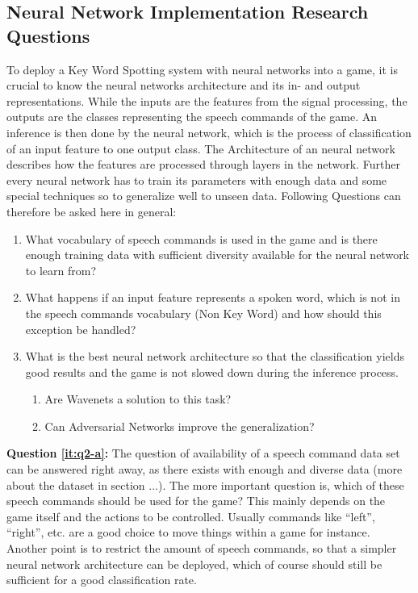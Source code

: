 \subsection{Neural Network Implementation Research Questions}
To deploy a Key Word Spotting system with neural networks into a game, it is crucial to know the neural networks architecture and its in- and output representations. 
While the inputs are the features from the signal processing, the outputs are the classes representing the speech commands of the game. 
An inference is then done by the neural network, which is the process of classification of an input feature to one output class.
The Architecture of an neural network describes how the features are processed through layers in the network.
Further every neural network has to train its parameters with enough data and some special techniques so to generalize well to unseen data.
Following Questions can therefore be asked here in general:

\begin{enumerate}[label={Q.2.\alph*)}, leftmargin=1.75cm]
    \item What vocabulary of speech commands is used in the game and is there enough training data with sufficient diversity available for the neural network to learn from?
    \label{it:q2-a}
    
    \item What happens if an input feature represents a spoken word, which is not in the speech commands vocabulary (Non Key Word) and how should this exception be handled?
    \label{it:q2-b}
    
    \item What is the best neural network architecture so that the classification yields good results and the game is not slowed down during the inference process.
    \label{it:q2-c}
    \begin{enumerate}[label=(\roman*)]
        \item Are Wavenets a solution to this task? 
        \item Can Adversarial Networks improve the generalization?
    \end{enumerate}
    
\end{enumerate}
\noindent
\textbf{Question \ref{it:q2-a}:} The question of availability of a speech command data set can be answered right away, as there exists with enough and diverse data (more about the dataset in section ...). The more important question is, which of these speech commands should be used for the game? This mainly depends on the game itself and the actions to be controlled. Usually commands like \enquote{left}, \enquote{right}, etc. are a good choice to move things within a game for instance.
Another point is to restrict the amount of speech commands, so that a simpler neural network architecture can be deployed, which of course should still be sufficient for a good classification rate.

